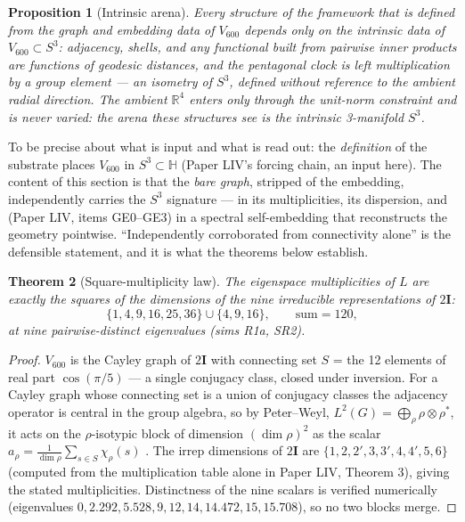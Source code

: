 \documentclass[12pt]{article}
\newtheorem{theorem}{Theorem}
\newtheorem{proposition}[theorem]{Proposition}
\theoremstyle{definition}
\theoremstyle{remark}
\newcommand{\twoI}{2\mathbf{I}}
\newcommand{\Hq}{\mathbb{H}}
\newcommand{\Vsix}{V_{600}}
\begin{document}
\begin{proposition}[Intrinsic arena]\label{prop:intrinsic}
Every structure of the framework that is defined from the graph and embedding data of $\Vsix$ depends only on the intrinsic data of $\Vsix \subset S^3$: adjacency, shells, and any functional built from pairwise inner products are functions of geodesic distances, and the pentagonal clock is left multiplication by a group element --- an isometry of $S^3$, defined without reference to the ambient radial direction. The ambient $\mathbb R^4$ enters only through the unit-norm constraint and is never varied: the arena these structures see is the intrinsic 3-manifold $S^3$.
\end{proposition}

To be precise about what is input and what is read out: the \emph{definition} of the substrate places $\Vsix$ in $S^3 \subset \Hq$ (Paper LIV's forcing chain, an input here). The content of this section is that the \emph{bare graph}, stripped of the embedding, independently carries the $S^3$ signature --- in its multiplicities, its dispersion, and (Paper LIV, items GE0--GE3) in a spectral self-embedding that reconstructs the geometry pointwise. ``Independently corroborated from connectivity alone'' is the defensible statement, and it is what the theorems below establish.

\begin{theorem}[Square-multiplicity law]\label{thm:squares}
The eigenspace multiplicities of $L$ are exactly the squares of the dimensions of the nine irreducible representations of $\twoI$:
$$\{1, 4, 9, 16, 25, 36\} \cup \{4, 9, 16\}, \qquad \text{sum} = 120,$$
at nine pairwise-distinct eigenvalues (sims R1a, SR2).
\end{theorem}

\begin{proof}
$\Vsix$ is the Cayley graph of $\twoI$ with connecting set $S$ = the 12 elements of real part $\cos(\pi/5)$ --- a single conjugacy class, closed under inversion. For a Cayley graph whose connecting set is a union of conjugacy classes the adjacency operator is central in the group algebra, so by Peter--Weyl, $L^2(G) = \bigoplus_\rho \rho \otimes \rho^*$, it acts on the $\rho$-isotypic block of dimension $(\dim\rho)^2$ as the scalar $a_\rho = \frac{1}{\dim\rho}\sum_{s\in S}\chi_\rho(s)$ \citep{Babai1979, DiaconisShahshahani1981}. The irrep dimensions of $\twoI$ are $\{1,2,2',3,3',4,4',5,6\}$ (computed from the multiplication table alone in Paper LIV, Theorem 3), giving the stated multiplicities. Distinctness of the nine scalars is verified numerically (eigenvalues $0, 2.292, 5.528, 9, 12, 14, 14.472, 15, 15.708$), so no two blocks merge.
\end{proof}
\end{document}
